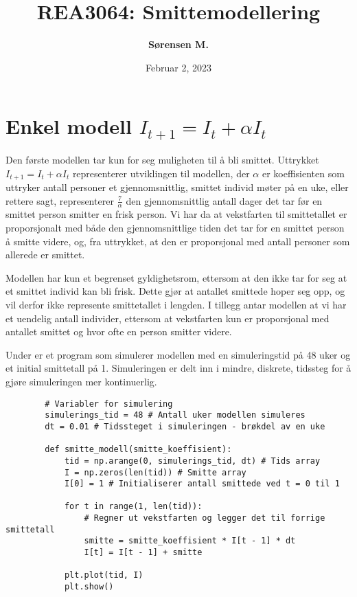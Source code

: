 \documentclass[12pt]{article}
\title{REA3064: Smittemodellering}
\author{\textbf{Sørensen M.}}
\affil{Amalie Skram VGS.}
\date{\Large{Februar 2, 2023}}
\begin{document}
\maketitle

\tableofcontents
\newpage

\section{Enkel modell $I_{t+1} = I_t + \alpha I_t$}
Den første modellen tar kun for seg muligheten til å bli smittet. Uttrykket $I_{t+1} = I_t + \alpha I_t$ 
representerer utviklingen til modellen, der $\alpha$ er koeffisienten som uttryker antall personer et gjennomsnittlig, 
smittet individ møter på en uke, eller rettere sagt, representerer $\frac{7}{\alpha}$ den gjennomsnittlig antall dager det 
tar før en smittet person smitter en frisk person. Vi har da at vekstfarten til smittetallet er proporsjonalt med både den 
gjennomsnittlige tiden det tar for en smittet person å smitte videre, og, fra uttrykket, at den er proporsjonal med antall 
personer som allerede er smittet.

Modellen har kun et begrenset gyldighetsrom, ettersom at den ikke tar for seg at et smittet individ kan bli frisk. Dette 
gjør at antallet smittede hoper seg opp, og vil derfor ikke represente smittetallet i lengden. I tillegg antar modellen at 
vi har et uendelig antall individer, ettersom at vekstfarten kun er proporsjonal med antallet smittet og hvor ofte en person 
smitter videre. 

Under er et program som simulerer modellen med en simuleringstid på 48 uker og et initial smittetall på 1. Simuleringen 
er delt inn i mindre, diskrete, tidssteg for å gjøre simuleringen mer kontinuerlig. 
\begin{Codesnippet}
    \begin{verbatim}
        # Variabler for simulering
        simulerings_tid = 48 # Antall uker modellen simuleres
        dt = 0.01 # Tidssteget i simuleringen - brøkdel av en uke

        def smitte_modell(smitte_koeffisient):
            tid = np.arange(0, simulerings_tid, dt) # Tids array
            I = np.zeros(len(tid)) # Smitte array
            I[0] = 1 # Initialiserer antall smittede ved t = 0 til 1

            for t in range(1, len(tid)):
                # Regner ut vekstfarten og legger det til forrige smittetall
                smitte = smitte_koeffisient * I[t - 1] * dt
                I[t] = I[t - 1] + smitte

            plt.plot(tid, I)
            plt.show()
    \end{verbatim}
\end{Codesnippet}
\end{document}
